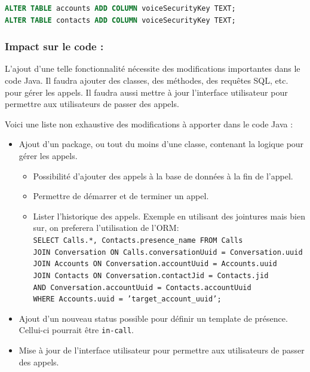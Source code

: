 \documentclass[a4paper,11pt]{article}
\begin{document}
\begin{lstlisting}[language=SQL]
ALTER TABLE accounts ADD COLUMN voiceSecurityKey TEXT;
ALTER TABLE contacts ADD COLUMN voiceSecurityKey TEXT;
\end{lstlisting}

\subsubsection*{Impact sur le code :}

L'ajout d'une telle fonctionnalité nécessite des modifications importantes dans le code Java. Il faudra ajouter des classes, des méthodes, des requêtes SQL, etc. pour gérer les appels. Il faudra aussi mettre à jour l'interface utilisateur pour permettre aux utilisateurs de passer des appels.

Voici une liste non exhaustive des modifications à apporter dans le code Java :
\begin{itemize}
	\item Ajout d'un package, ou tout du moins d'une classe, contenant la logique pour gérer les appels.
	\begin{itemize}
		\item Possibilité d'ajouter des appels à la base de données à la fin de l'appel. 
		\item Permettre de démarrer et de terminer un appel.
		\item Lister l'historique des appels. Exemple en utilisant des jointures mais bien sur, on preferera l'utilisation de l'ORM:\\
			\texttt{SELECT Calls.*, Contacts.presence\_name FROM Calls}\\
			\texttt{JOIN Conversation ON Calls.conversationUuid = Conversation.uuid}\\
			\texttt{JOIN Accounts ON Conversation.accountUuid = Accounts.uuid}\\
			\texttt{JOIN Contacts ON Conversation.contactJid = Contacts.jid}\\
			\texttt{AND Conversation.accountUuid = Contacts.accountUuid}\\
			\texttt{WHERE Accounts.uuid = 'target\_account\_uuid';}
	\end{itemize}
	\item Ajout d'un nouveau status possible pour définir un template de présence. Cellui-ci pourrait être \texttt{in-call}.
	\item Mise à jour de l'interface utilisateur pour permettre aux utilisateurs de passer des appels.
\end{itemize}
\end{document}
